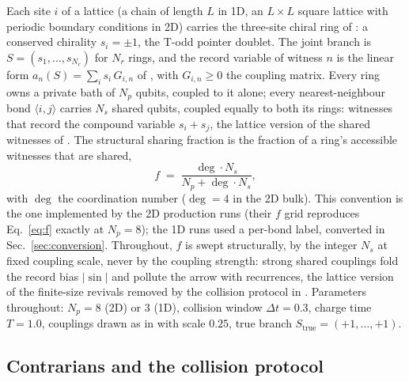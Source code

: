 \documentclass[11pt]{article}
\begin{document}
Each site $i$ of a lattice (a chain of length $L$ in 1D, an $L \times L$
square lattice with periodic boundary conditions in 2D) carries the
three-site chiral ring of \cite{p1}: a conserved chirality $s_i = \pm 1$,
the T-odd pointer doublet. The joint branch is $S = (s_1,\dots,s_{N_r})$ for
$N_r$ rings, and the record variable of witness $n$ is the linear form
$a_n(S) = \sum_i s_i\, G_{i,n}$ of \cite{p2}, with $G_{i,n} \ge 0$ the
coupling matrix. Every ring owns a private bath of $N_p$ qubits, coupled to
it alone; every nearest-neighbour bond $\langle i,j\rangle$ carries $N_s$
shared qubits, coupled equally to both its rings: witnesses that record the
compound variable $s_i + s_j$, the lattice version of the shared witnesses
of \cite{p2}. The structural sharing fraction is the fraction of a ring's
accessible witnesses that are shared,
%
\begin{equation}
f \;=\; \frac{\deg \cdot N_s}{N_p + \deg \cdot N_s},
\label{eq:f}
\end{equation}
%
with $\deg$ the coordination number ($\deg = 4$ in the 2D bulk). This
convention is the one implemented by the 2D production runs (their $f$
grid reproduces Eq.~\eqref{eq:f} exactly at $N_p=8$); the 1D runs used a
per-bond label, converted in Sec.~\ref{sec:conversion}.
Throughout, $f$ is swept structurally, by the integer $N_s$ at fixed
coupling scale, never by the coupling strength: strong shared couplings fold
the record bias $|\sin|$ and pollute the arrow with recurrences, the lattice
version of the finite-size revivals removed by the collision protocol in
\cite{p1}. Parameters throughout: $N_p = 8$ (2D) or $3$ (1D), collision
window $\Delta t = 0.3$, charge time $T = 1.0$, couplings drawn as in
\cite{p1} with scale $0.25$, true branch $S_{\mathrm{true}} = (+1,\dots,+1)$.

\subsection{Contrarians and the collision protocol}
\end{document}
